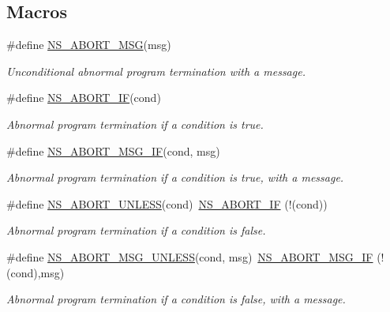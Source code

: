 \subsection*{Macros}
\begin{DoxyCompactItemize}
\item 
\#define \hyperlink{group__fatal_ga51ac4699be799d772ae7258d1ef6af21}{N\+S\+\_\+\+A\+B\+O\+R\+T\+\_\+\+M\+SG}(msg)
\begin{DoxyCompactList}\small\item\em Unconditional abnormal program termination with a message. \end{DoxyCompactList}\item 
\#define \hyperlink{group__fatal_ga979468222aa80366c2c98aa1554f3eec}{N\+S\+\_\+\+A\+B\+O\+R\+T\+\_\+\+IF}(cond)
\begin{DoxyCompactList}\small\item\em Abnormal program termination if a condition is {\ttfamily true}. \end{DoxyCompactList}\item 
\#define \hyperlink{group__fatal_ga6653324225bc139e46deea177614ceee}{N\+S\+\_\+\+A\+B\+O\+R\+T\+\_\+\+M\+S\+G\+\_\+\+IF}(cond,  msg)
\begin{DoxyCompactList}\small\item\em Abnormal program termination if a condition is {\ttfamily true}, with a message. \end{DoxyCompactList}\item 
\#define \hyperlink{group__fatal_ga5613f5d2439ad7e8717d4e5c4ff699e8}{N\+S\+\_\+\+A\+B\+O\+R\+T\+\_\+\+U\+N\+L\+E\+SS}(cond)~\hyperlink{group__fatal_ga979468222aa80366c2c98aa1554f3eec}{N\+S\+\_\+\+A\+B\+O\+R\+T\+\_\+\+IF} (!(cond))
\begin{DoxyCompactList}\small\item\em Abnormal program termination if a condition is {\ttfamily false}. \end{DoxyCompactList}\item 
\#define \hyperlink{group__fatal_ga0bd3f62c55e7347ff814572f3aaa3864}{N\+S\+\_\+\+A\+B\+O\+R\+T\+\_\+\+M\+S\+G\+\_\+\+U\+N\+L\+E\+SS}(cond,  msg)~\hyperlink{group__fatal_ga6653324225bc139e46deea177614ceee}{N\+S\+\_\+\+A\+B\+O\+R\+T\+\_\+\+M\+S\+G\+\_\+\+IF} (!(cond),msg)
\begin{DoxyCompactList}\small\item\em Abnormal program termination if a condition is {\ttfamily false}, with a message. \end{DoxyCompactList}\item 

\end{DoxyCompactItemize}
